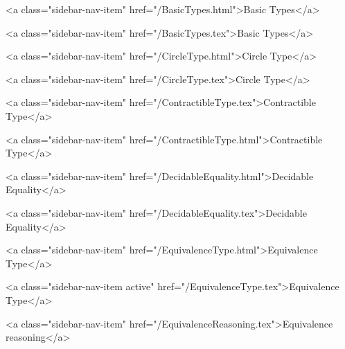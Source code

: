           <a class="sidebar-nav-item" href="/BasicTypes.html">Basic Types</a>
        
      
    
      
        
          <a class="sidebar-nav-item" href="/BasicTypes.tex">Basic Types</a>
        
      
    
      
        
          <a class="sidebar-nav-item" href="/CircleType.html">Circle Type</a>
        
      
    
      
        
          <a class="sidebar-nav-item" href="/CircleType.tex">Circle Type</a>
        
      
    
      
        
          <a class="sidebar-nav-item" href="/ContractibleType.tex">Contractible Type</a>
        
      
    
      
        
          <a class="sidebar-nav-item" href="/ContractibleType.html">Contractible Type</a>
        
      
    
      
        
          <a class="sidebar-nav-item" href="/DecidableEquality.html">Decidable Equality</a>
        
      
    
      
        
          <a class="sidebar-nav-item" href="/DecidableEquality.tex">Decidable Equality</a>
        
      
    
      
        
          <a class="sidebar-nav-item" href="/EquivalenceType.html">Equivalence Type</a>
        
      
    
      
        
          <a class="sidebar-nav-item active" href="/EquivalenceType.tex">Equivalence Type</a>
        
      
    
      
        
          <a class="sidebar-nav-item" href="/EquivalenceReasoning.tex">Equivalence reasoning</a>
        
      
    
